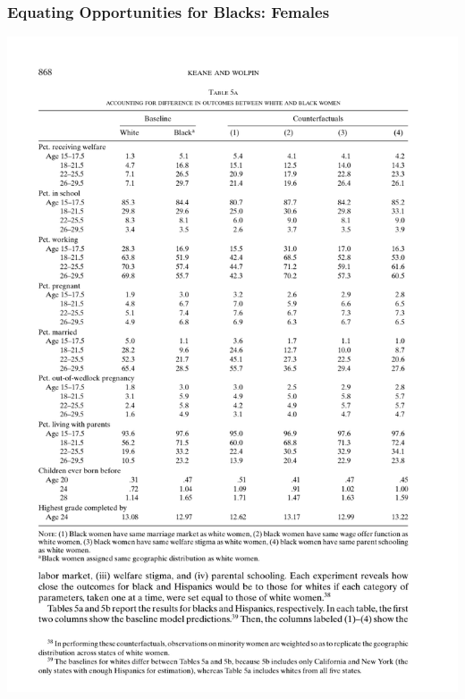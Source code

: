 \begin{frame}
	\frametitle{Equating Opportunities for Blacks: Females}
		\includegraphics[width=\textwidth]{tab-figs/table5a_2010_header} \\

\end{frame}
